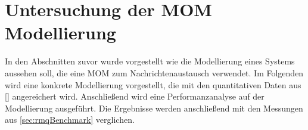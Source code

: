 

\section{Untersuchung der MOM Modellierung}
In den Abschnitten zuvor wurde vorgestellt wie die Modellierung eines Systems aussehen soll, die eine MOM zum Nachrichtenaustausch verwendet. Im Folgenden wird eine konkrete Modellierung vorgestellt, die mit den quantitativen Daten aus \autoref{} angereichert wird. Anschließend wird eine Performanzanalyse auf der Modellierung ausgeführt. Die Ergebnisse werden anschließend mit den Messungen aus \autoref{sec:rmqBenchmark} verglichen.

